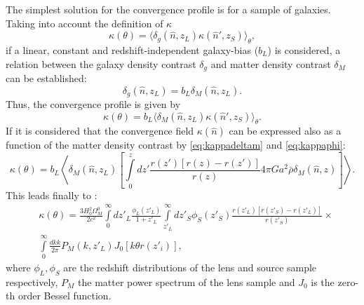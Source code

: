 The simplest solution for the convergence profile is for a sample of galaxies. Taking into account the definition of $\kappa$
\begin{equation}
\kappa(\theta) = \langle\delta_g(\hat n,z_L)\kappa(\hat n',z_S)\rangle_\theta,
\end{equation}
if a linear, constant and redshift-independent galaxy-bias ($b_L$) is considered, a relation between the galaxy density contrast $\delta_g$ and matter density contrast $\delta_M$ can be established:
\begin{equation}
\delta_g(\hat n,z_L) = b_L\delta_M(\hat n,z_L).
\end{equation}
Thus, the convergence profile is given by
\begin{equation}
\kappa(\theta) = b_L\langle\delta_M(\hat n,z_L)\kappa(\hat n',z_S)\rangle_\theta.
\end{equation}
If it is considered that the convergence field $\kappa(\hat n)$ can be expressed also as a function of the matter density contrast by \autoref{eq:kappadeltam} and \autoref{eq:kappaphi}:
\begin{equation}
\kappa(\theta) = b_L\left\langle\delta_M(\hat n,z_L)\left[\int\limits_0^zdz'\frac{r(z')[r(z)-r(z')]}{r(z)}4\pi Ga^2\bar\rho\delta_M(\hat n,z)\right]\right\rangle.
\end{equation}
This leads finally to \cite{2003A&A...403..817M}:
\begin{eqnarray}
&\kappa(\theta)=\frac{3H_0^2\Omega_M^0}{2c^2}\int\limits_0^\infty dz'_L\frac{\phi_L(z'_L)}{1+z'_L}\int\limits_{z'_L}^\infty dz'_S\phi_S(z'_S)\frac{r(z'_L)[r(z'_S)-r(z'_L)]}{r(z'_S)}\times\\
&\int\limits_0^\infty\frac{dkk}{2\pi}P_M(k,z'_L)J_0[k\theta r(z'_i)],\nonumber
\label{eq:omega0}
\end{eqnarray}
where $\phi_L,\phi_S$ are the redshift distributions of the lens and source sample respectively, $P_M$ the matter power spectrum of the lens sample and $J_0$ is the zero-th order Bessel function.
\newline

